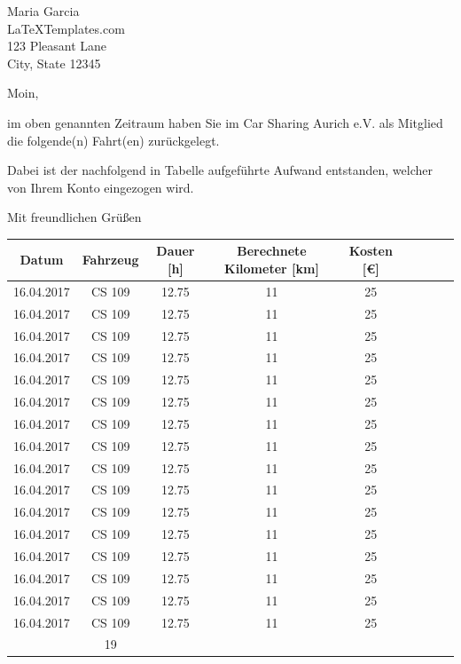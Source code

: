 \documentclass[
	pagenumber=false, %
	parskip=half, %
	fromalign=right, %
	foldmarks=true, %
	addrfield=true %
	firstfoot=on %
    ]{scrlttr2}
\date{5. August 2017} %
\begin{document}
 
\begin{letter}{Maria Garcia \\ LaTeXTemplates.com \\ 123 Pleasant Lane \\ City, State 12345} %


\opening{Moin,}

im oben genannten Zeitraum haben Sie im Car Sharing Aurich e.V. als Mitglied die folgende(n) Fahrt(en) zurückgelegt.

Dabei ist der nachfolgend in Tabelle aufgeführte Aufwand entstanden, welcher von Ihrem Konto eingezogen wird.

\closing{Mit freundlichen Grüßen}




\end{letter}

\newpage
\begin{tabular}{ | c | c | c | c | c | c | c | c | c | }
\hline
Datum & Fahrzeug & Dauer [h] & Berechnete Kilometer [km]& Kosten [\euro{}]\\ \hline
16.04.2017 & CS 109 & 12.75 & 11 & 25 \\ 
16.04.2017 & CS 109 & 12.75 & 11 & 25 \\ 
16.04.2017 & CS 109 & 12.75 & 11 & 25 \\ 
16.04.2017 & CS 109 & 12.75 & 11 & 25 \\ 
16.04.2017 & CS 109 & 12.75 & 11 & 25 \\ 
16.04.2017 & CS 109 & 12.75 & 11 & 25 \\ 
16.04.2017 & CS 109 & 12.75 & 11 & 25 \\ 
16.04.2017 & CS 109 & 12.75 & 11 & 25 \\ 
16.04.2017 & CS 109 & 12.75 & 11 & 25 \\ 
16.04.2017 & CS 109 & 12.75 & 11 & 25 \\ 
16.04.2017 & CS 109 & 12.75 & 11 & 25 \\ 
16.04.2017 & CS 109 & 12.75 & 11 & 25 \\ 
16.04.2017 & CS 109 & 12.75 & 11 & 25 \\ 
16.04.2017 & CS 109 & 12.75 & 11 & 25 \\ 
16.04.2017 & CS 109 & 12.75 & 11 & 25 \\ 
16.04.2017 & CS 109 & 12.75 & 11 & 25 \\ 
\hhline{|-|-|-|-|=|}
\multicolumn{4}{|r|}{Summe:} &19\\\hline
\end{tabular}
\end{document}
